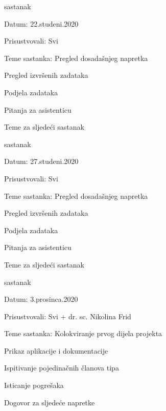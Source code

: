 \begin{packed_enum}
				\item  sastanak
			\item[] \begin{packed_item}
				\item Datum: 22.studeni.2020
				\item Prisustvovali: Svi
				\item Teme sastanka: Pregled dosadašnjeg napretka
				\begin{packed_item}
				    \item Pregled izvršenih zadataka
					\item Podjela zadataka
					\item Pitanja za asistenticu
					\item Teme za sljedeći sastanak
				\end{packed_item}
			\end{packed_item}
			
				\item  sastanak
			\item[] \begin{packed_item}
				\item Datum: 27.studeni.2020
				\item Prisustvovali: Svi
				\item Teme sastanka: Pregled dosadašnjeg napretka
				\begin{packed_item}
				    \item Pregled izvršenih zadataka
					\item Podjela zadataka
					\item Pitanja za asistenticu
					\item Teme za sljedeći sastanak
				\end{packed_item}
			\end{packed_item}
			
			\item  sastanak
			\item[] \begin{packed_item}
				\item Datum: 3.prosinca.2020
				\item Prisustvovali: Svi + dr. sc. Nikolina Frid
				\item Teme sastanka: Kolokviranje prvog dijela projekta
				\begin{packed_item}
                    \item Prikaz aplikacije i dokumentacije
                    \item Ispitivanje pojedinačnih članova tipa
                    \item Isticanje pogrešaka
                    \item Dogovor za sljedeće napretke
				\end{packed_item}
			\end{packed_item}
			

\end{packed_enum}
